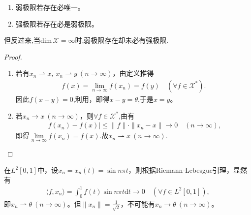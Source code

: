 \documentclass[../../main.tex]{subfiles}%
\begin{document}
\begin{proposition}
\begin{enumerate}[(1)]
\item 弱极限若存在必唯一。
\item 强极限若存在必是弱极限。
\end{enumerate}
\end{proposition}
\begin{remark}
但反过来,当$\text{dim}\,\mathscr{X}=\infty$时,弱极限存在却未必有强极限.
\end{remark}
\begin{proof}
\begin{enumerate}[(1)]
\item 若有$x_n\rightharpoonup x,\ x_n\rightharpoonup y\ (n\to\infty)$，由定义推得
\begin{align*}
f(x)=\lim\limits_{n\to\infty}f(x_n)=f(y)\quad(\forall f\in\mathscr{X}^*).
\end{align*}
因此$f(x-y)=0$,利用，即得$x-y=\theta$,于是$x=y$。

\item 若$x_n\to x\ (n\to\infty)$，则$\forall f\in\mathscr{X}^*$,由有
\begin{align*}
|f(x_n)-f(x)|\leqslant\|f\|\cdot\|x_n-x\|\to0\quad(n\to\infty),
\end{align*}
即得$\lim\limits_{n\to\infty}f(x_n)=f(x)$.故$x_n\rightharpoonup x\ (n\to\infty)$.
\end{enumerate}

\end{proof}

\begin{example}
在$L^2[0,1]$中，设$x_n=x_n(t)=\sin n\pi t$，则根据Riemann-Lebesgue引理，显然有
\begin{align*}
\langle f,x_n\rangle=\int_{0}^{1}f(t)\sin n\pi t\mathrm{d}t\to0\quad(\forall f\in L^2[0,1]),
\end{align*}
即$x_n\rightharpoonup\theta\ (n\to\infty)$。但$\|x_n\|=\frac{1}{\sqrt{2}}$，不可能有$x_n\to\theta\ (n\to\infty)$。
\end{example}
\end{document}
